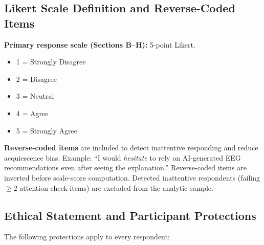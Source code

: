 \subsection*{Likert Scale Definition and Reverse-Coded Items}

\noindent\textbf{Primary response scale (Sections B--H):} 5-point Likert.
\begin{itemize}[leftmargin=*, itemsep=1pt]
    \item 1 = Strongly Disagree
    \item 2 = Disagree
    \item 3 = Neutral
    \item 4 = Agree
    \item 5 = Strongly Agree
\end{itemize}

\noindent\textbf{Reverse-coded items} are included to detect inattentive responding and reduce acquiescence bias. Example: ``I would \emph{hesitate} to rely on AI-generated EEG recommendations even after seeing the explanation.'' Reverse-coded items are inverted before scale-score computation. Detected inattentive respondents (failing $\geq 2$ attention-check items) are excluded from the analytic sample.

\subsection*{Ethical Statement and Participant Protections}

\noindent The following protections apply to every respondent:

